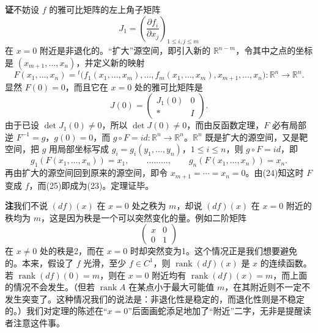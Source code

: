 \noindent\textbf{证}\quad 不妨设 $f$ 的雅可比矩阵的左上角子矩阵
\[
 J_1=\left(\frac{\partial f_i}{\partial x_j}\right)_{1\le i,j\le m}
\]
在 $x=0$ 附近是非退化的。“扩大”源空间，即引入新的 $\mathbb R^{n-m}$，令其中之点的坐标是 $(x_{m+1},\ldots,x_n)$，并定义新的映射
\begin{equation}
 F(x_1,\ldots,x_n)
 ={}^t\bigl(f_1(x_1,\ldots,x_m),\ldots,f_m(x_1,\ldots,x_m),x_{m+1},\ldots,x_n\bigr):
 \mathbb R^n\to\mathbb R^n.
 \tag{24}
\end{equation}
显然 $F(0)=0$，而且它在 $x=0$ 处的雅可比矩阵是
\[
 J(0)=
 \begin{pmatrix}
  J_1(0)&0\\
  *&I
 \end{pmatrix}.
\]
由于已设 $\det J_1(0)\ne0$，所以 $\det J(0)\ne0$，而由反函数定理，$F$ 必有局部逆 $F^{-1}=g$，$g(0)=0$，而 $g\circ F=id:\mathbb R^n\to\mathbb R^n$。$\mathbb R^n$ 既是扩大的源空间，又是靶空间，把 $g$ 用局部坐标写成 $g_i=g_i(y_1,\ldots,y_n)$，$1\le i\le n$，则 $g\circ F=id$，即
\begin{equation}
 g_1(F(x_1,\ldots,x_n))=x_1,
 \qquad\ldots\ldots\ldots,
 \qquad
 g_n(F(x_1,\ldots,x_n))=x_n.
 \tag{25}
\end{equation}
再由扩大的源空间回到原来的源空间，即令 $x_{m+1}=\cdots=x_n=0$。由(24)知这时 $F$ 变成 $f$，而(25)即成为(23)。定理证毕。

\noindent\textbf{注}\quad 我们不说 $(df)(x)$ 在 $x=0$ 处之秩为 $m$，却说 $(df)(x)$ 在 $x=0$ 附近的秩均为 $m$，这是因为秩是一个可以突然变化的量。例如二阶矩阵
\[
 \begin{pmatrix}x&0\\0&1\end{pmatrix}
\]
在 $x\ne0$ 处的秩是2，而在 $x=0$ 时却突然变为1。这个情况正是我们想要避免的。本来，假设了 $f$ 光滑，至少 $f\in C^1$，则 $\operatorname{rank}(df)(x)$ 是 $x$ 的连续函数。若 $\operatorname{rank}(df)(0)=m$，则在 $x=0$ 附近均有 $\operatorname{rank}(df)(x)=m$，而上面的情况不会发生。（但若 $\operatorname{rank}A$ 在某点小于最大可能值 $m$，在其附近则不一定不发生突变了。这种情况我们的说法是：非退化性是稳定的，而退化性则是不稳定的。）我们对定理的陈述在“$x=0$”后面画蛇添足地加了“附近”二字，无非是提醒读者注意这件事。

